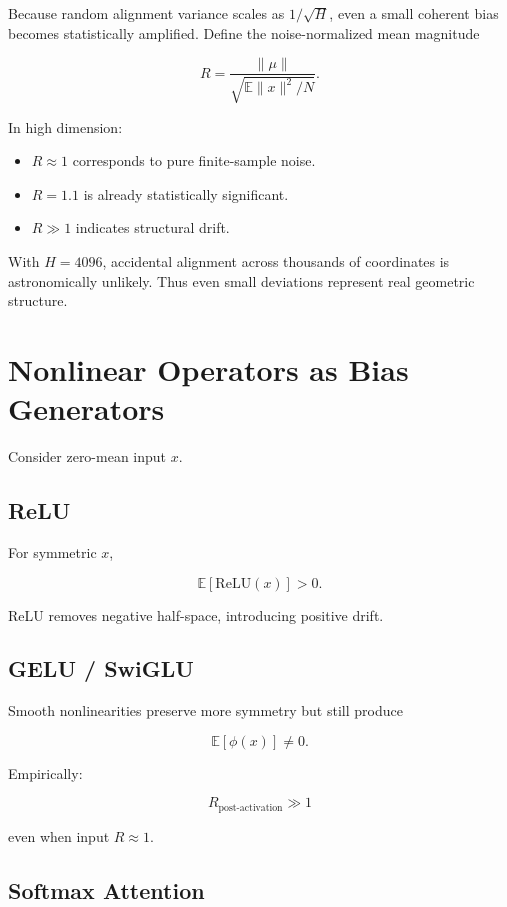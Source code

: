 Because random alignment variance scales as $1/\sqrt{H}$,
even a small coherent bias becomes statistically amplified.
Define the noise-normalized mean magnitude

\[
R = \frac{\|\mu\|}{\sqrt{\mathbb{E}\|x\|^2/N}}.
\]

In high dimension:

\begin{itemize}
\item $R \approx 1$ corresponds to pure finite-sample noise.
\item $R = 1.1$ is already statistically significant.
\item $R \gg 1$ indicates structural drift.
\end{itemize}

With $H=4096$, accidental alignment across thousands of coordinates is
astronomically unlikely.
Thus even small deviations represent real geometric structure.

\section{Nonlinear Operators as Bias Generators}

Consider zero-mean input $x$.

\subsection{ReLU}

For symmetric $x$,

\[
\mathbb{E}[\text{ReLU}(x)] > 0.
\]

ReLU removes negative half-space, introducing positive drift.

\subsection{GELU / SwiGLU}

Smooth nonlinearities preserve more symmetry but still produce

\[
\mathbb{E}[\phi(x)] \neq 0.
\]

Empirically:

\[
R_{\text{post-activation}} \gg 1
\]

even when input $R \approx 1$.

\subsection{Softmax Attention}

